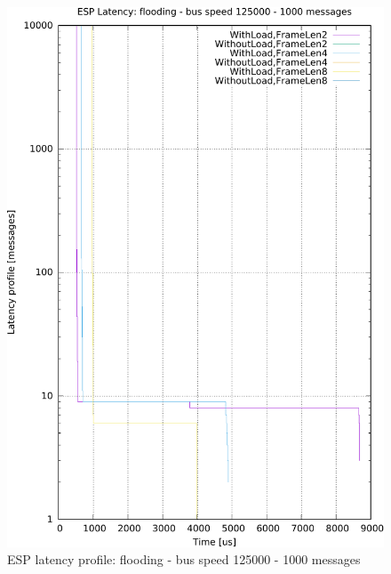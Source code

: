 \documentclass{ctuthesis}
\begin{document}
\begin{figure}[htb]
\includegraphics[width=\linewidth]{figures/speed125000_messages1000_floodTrue.pdf}
\caption{ESP latency profile: flooding - bus speed 125000 - 1000 messages}
\end{figure}
\end{document}
